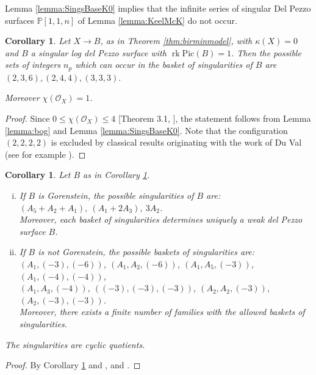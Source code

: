 \documentclass[11pt]{amsart}
\newtheorem{corollary}[theorem]{Corollary}
\theoremstyle{definition}
\theoremstyle{definition}
\theoremstyle{remark}
\theoremstyle{remark}
\theoremstyle{definition}
\theoremstyle{conjecture}
\newcommand{\Pic}{\mathrm{Pic}}
\begin{document}
Lemma \ref{lemma:SingsBaseK0} implies that the  infinite series of singular Del Pezzo surfaces $\mathbb{P}[1,1,n]$ of Lemma \ref{lemma:KeelMcK}
 do not occur.
 
\begin{corollary}\label{cor:numbasketsK0} Let $X \to B$, as in Theorem \ref{thm:birminmodel}, with $\kappa(X)=0$ and  
 $B$  a  singular log del Pezzo surface with $\operatorname{rk}{\Pic}(B)=1$.  Then the possible sets of integers $n_p$ which can occur in the
basket of singularities of $B$ are
$
(2,3,6),
(2,4,4),
(3,3,3).$

Moreover $\chi(\mathcal O_X)=1$.
    
\end{corollary}
\begin{proof}
Since  $0 \leq \chi(\mathcal O_X) \leq 4$ [Theorem 3.1, \cite{KawamataK0}],   the statement follows from Lemma \ref{lemma:bog} and Lemma \ref{lemma:SingsBaseK0}. Note that the configuration $(2,2,2,2)$  is excluded by classical results  originating with the work of Du Val (see for example \cite{YeGorLogDelPezzo}). \end{proof}
\begin{corollary}\label{cor:basketK0} Let $B$ as in Corollary \ref{cor:numbasketsK0}. 
\begin{enumerate}[(i)]
    \item If $B$ is Gorenstein, the possible singularities of $B$ are:\\
$(A_5+A_2+A_1), \
(A_1 + 2 A_3), \ 3A_2$.\\
Moreover, each basket of singularities determines uniquely
a weak del Pezzo surface $B$.
\item If $B$ is not Gorenstein, the possible baskets of singularities are:\\
$(A_1, (-3), (-6))$, $(A_1, A_2, (-6))$, $(A_1, A_5, (-3))$, $(A_1, (-4), (-4))$, \\$(A_1, A_3, (-4))$, $ ((-3),(-3), (-3))$, $(A_2, A_2, (-3))$, $(A_2,  (-3), (-3))$. \\
Moreover, there exists
a finite number of
families with the allowed baskets of singularities.
\end{enumerate}
The singularities are cyclic quotients.
\end{corollary}

\begin{proof} By Corollary \ref{cor:numbasketsK0} and \cite{YeGorLogDelPezzo}, \cite{KeelMcKernan1999} and \cite{Lacini2024}.  \end{proof}
\end{document}

